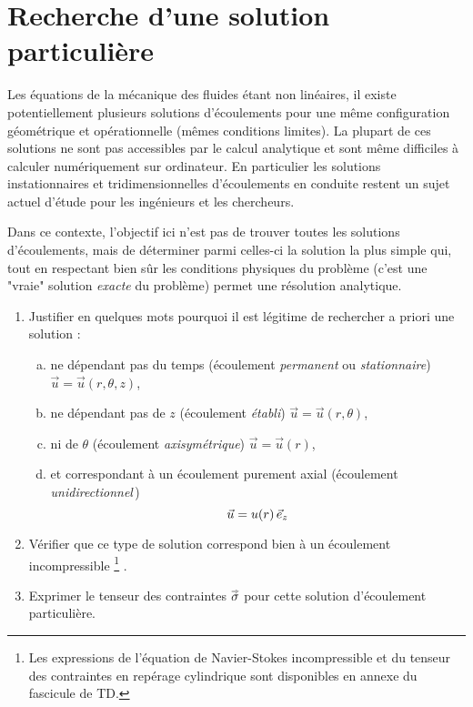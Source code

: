 \documentclass[10pt, a4paper]{article}
\renewcommand{\myvec}[1]{\vec{#1}}
\newcommand{\footnoteremember}[2]{
\footnote{#2}
\newcounter{#1}
\setcounter{#1}{\value{footnote}}%
}
\newcommand{\footnoterecall}[1]{
\footnotemark[\value{#1}]
}
\begin{document}
\section{Recherche d'une solution particulière}

Les équations de la mécanique des fluides étant non linéaires, 
il existe potentiellement plusieurs solutions d'écoulements 
pour une même configuration géométrique et opérationnelle (mêmes conditions limites).
La plupart de ces solutions ne sont pas accessibles par le calcul analytique et sont même difficiles
à calculer numériquement sur ordinateur.
En particulier les solutions instationnaires et tridimensionnelles d'écoulements en conduite restent
un sujet actuel d'étude pour les ingénieurs et les chercheurs.

Dans ce contexte, l'objectif ici n'est pas de trouver toutes les solutions d'écoulements, 
mais de déterminer parmi celles-ci la solution la plus simple qui, tout en respectant bien sûr
les conditions physiques du problème (c'est une "vraie" solution \textsl{exacte} du problème) 
permet une résolution analytique.

\begin{enumerate}
\item 
Justifier en quelques mots pourquoi il est légitime de rechercher a priori une solution :
\begin{enumerate}[a)]
\item 
  ne dépendant pas du temps
  (écoulement \textsl{permanent} ou \textsl{stationnaire}) $\myvec{u} = \myvec{u}(r, \theta, z)$,
\item 
	ne dépendant pas de $z$
	(écoulement \textsl{établi}) $\myvec{u} = \myvec{u}(r, \theta)$,
\item
	ni de $\theta$ (écoulement \textsl{axisymétrique}) $\myvec{u} = \myvec{u}(r)$,
\item 
	et correspondant à un écoulement purement axial (écoulement \textsl{unidirectionnel}\,)
	\begin{equation}
		\myvec{u} = u(r) \, \ez
		\label{eq:solution}
	\end{equation}
\end{enumerate}
\item
	Vérifier que ce type de solution correspond bien à un écoulement 
	incompressible\footnoteremember{cylindriques}{
	Les expressions de l'équation de Navier-Stokes incompressible 
	et du tenseur des contraintes en repérage cylindrique 
	sont disponibles en annexe du fascicule de TD.}\!\!.
\item
	Exprimer le tenseur des contraintes\footnoterecall{cylindriques} \!\!\!
	$\accentset{\Rightarrow}{\sigma}$ pour cette solution d'écoulement particulière.
\end{enumerate}
\end{document}
